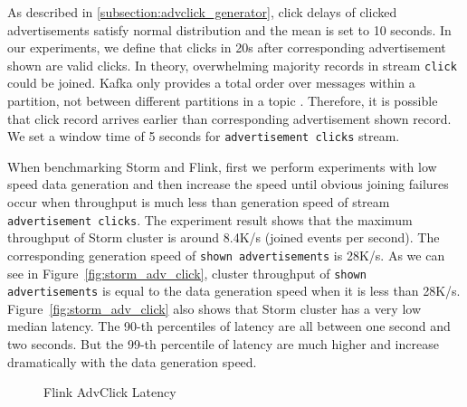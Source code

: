 As described in \cref{subsection:advclick_generator}, click delays of clicked advertisements satisfy normal distribution and the mean is set to 10 seconds. In our experiments, we define that clicks in 20s after corresponding advertisement shown are valid clicks. In theory, overwhelming majority records in stream \texttt{click} could be joined. Kafka only provides a total order over messages within a partition, not between different partitions in a topic \cite{Kafka}. Therefore, it is possible that click record arrives earlier than corresponding advertisement shown record. We set a window time of 5 seconds for \texttt{advertisement clicks} stream.

When benchmarking Storm and Flink, first we perform experiments with low speed data generation and then increase the speed until obvious joining failures occur when throughput is much less than generation speed of stream \texttt{advertisement clicks}. The experiment result shows that the maximum throughput of Storm cluster is around 8.4K/s (joined events per second). The corresponding generation speed of \texttt{shown advertisements} is 28K/s. As we can see in Figure~\ref{fig:storm_adv_click}, cluster throughput of  \texttt{shown advertisements} is equal to the data generation speed  when it is less than 28K/s. Figure~\ref{fig:storm_adv_click} also shows that Storm cluster has a very low median latency. The 90-th percentiles of latency are all between one second and two seconds. But the 99-th percentile of latency are much higher and increase dramatically with the data generation speed.

\begin{figure}
  \begin{center}
   \caption{Flink AdvClick Latency}
   \label{fig:flink_adv_click}
  \end{center}
\end{figure}


